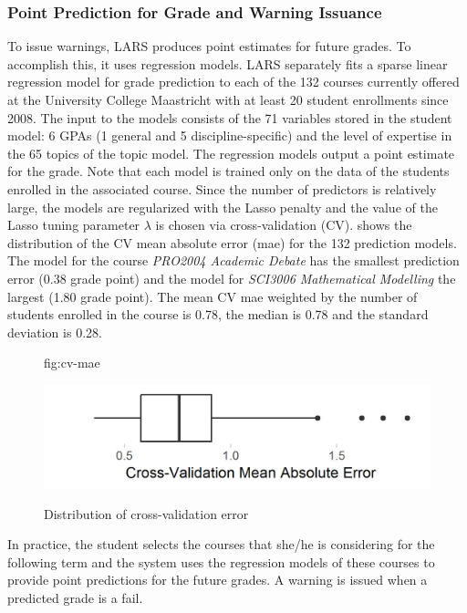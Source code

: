 \documentclass[pmlr]{jmlr}%
\begin{document}
\subsubsection{Point Prediction for Grade and Warning Issuance}

To issue warnings, LARS produces point estimates for future grades. To accomplish this, it uses regression models.  LARS separately fits a sparse linear regression model for grade prediction to each of the 132 courses currently offered at the University College Maastricht with at least 20 student enrollments since 2008. The input to the models consists of the 71 variables stored in the student model: 6 GPAs (1 general and 5 discipline-specific) and the level of expertise in the 65 topics of the topic model. The regression models output a point estimate for the grade. Note that each model is trained only on the data of the students enrolled in the associated course. Since the number of predictors is relatively large, the models are regularized with the Lasso penalty \citep{Tibshirani.1996} and the value of the Lasso tuning parameter $\lambda$ is chosen via cross-validation (CV).  shows the distribution of the CV mean absolute error (mae) for the 132 prediction models. The model for the course \textit{PRO2004 Academic Debate} has the smallest prediction error (0.38 grade point) and the model for \textit{SCI3006 Mathematical Modelling} the largest (1.80 grade point). The mean CV mae weighted by the number of students enrolled in the course is 0.78, the median is 0.78 and the standard deviation is 0.28.


\begin{figure}[htbp]
	\floatconts
	{fig:cv-mae}
	{\caption{Distribution of cross-validation error}}
	{\includegraphics[width=0.5\linewidth]{figures/cv-mae}}
\end{figure}

In practice, the student selects the courses that she/he is considering for the following term and the system uses the regression models of these courses to provide point predictions for the future grades. A warning is issued when a predicted grade is a fail.
\end{document}

